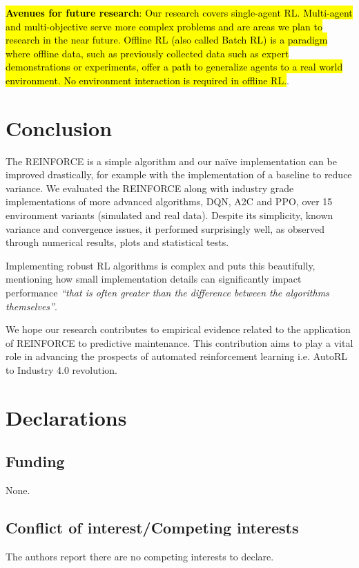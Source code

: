 \documentclass[referee, sn-mathphys-num]{sn-jnl}
\newcommand{\hlc}[2][cyan!17]{{\colorlet{foo}{#1}\sethlcolor{foo}\hl{#2}}}
\begin{document}
	\hlc{\textbf{Avenues for future research}: Our research covers single-agent RL. Multi-agent and multi-objective serve more complex problems and are areas we plan to research in the near future. Offline RL (also called Batch RL) is a paradigm where offline data, such as previously collected data such as expert demonstrations or experiments, offer a path to generalize agents to a real world environment. No environment interaction is required in offline RL.}.
	
	\section{Conclusion}\label{sec_Conclusion}
	The REINFORCE is a simple algorithm and our na\"ive implementation can be improved drastically, for example with the implementation of a baseline to reduce variance. We evaluated the REINFORCE along with industry grade implementations of more advanced algorithms, DQN, A2C and PPO, over 15 environment variants (simulated and real data). Despite its simplicity, known variance and convergence issues, it performed surprisingly well, as observed through numerical results, plots and statistical tests. 
	
	Implementing robust RL algorithms is complex and \cite{SB3-paper} puts this beautifully, mentioning how small implementation details can significantly impact performance \textit{``that is often greater than the difference between the algorithms themselves''}. 
	
	We hope our research contributes to empirical evidence related to the application of REINFORCE to predictive maintenance. This contribution aims to play a vital role in advancing the prospects of automated reinforcement learning i.e. AutoRL to Industry 4.0 revolution.
	
	\backmatter
	
	
	
	\section*{Declarations}
	
	\subsection*{Funding}
	None.
	\subsection*{Conflict of interest/Competing interests}
	The authors report there are no competing interests to declare.
	
\end{document}
